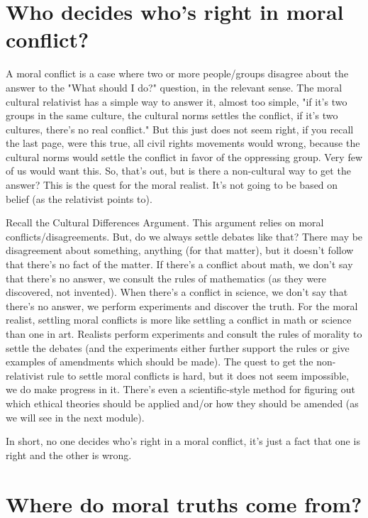 \section{Who decides who's right in moral conflict?}

A moral conflict is a case where two or more people/groups disagree about the answer to the "What should I do?" question, in the relevant sense. The moral cultural relativist has a simple way to answer it, almost too simple, "if it's two groups in the same culture, the cultural norms settles the conflict, if it's two cultures, there's no real conflict." But this just does not seem right, if you recall the last page, were this true, all civil rights movements would wrong, because the cultural norms would settle the conflict in favor of the oppressing group. Very few of us would want this. So, that's out, but is there a non-cultural way to get the answer? This is the quest for the moral realist. It's not going to be based on belief (as the relativist points to).

Recall the Cultural Differences Argument. This argument relies on moral conflicts/disagreements. But, do we always settle debates like that? There may be disagreement about something, anything (for that matter), but it doesn't follow that there's no fact of the matter. If there's a conflict about math, we don't say that there's no answer, we consult the rules of mathematics (as they were discovered, not invented). When there's a conflict in science, we don't say that there's no answer, we perform experiments and discover the truth. For the moral realist, settling moral conflicts is more like settling a conflict in math or science than one in art. Realists perform experiments and consult the rules of morality to settle the debates (and the experiments either further support the rules or give examples of amendments which should be made). The quest to get the non-relativist rule to settle moral conflicts is hard, but it does not seem impossible, we do make progress in it. There's even a scientific-style method for figuring out which ethical theories should be applied and/or how they should be amended (as we will see in the next module).

In short, no one decides who's right in a moral conflict, it's just a fact that one is right and the other is wrong.

\section{Where do moral truths come from?}

